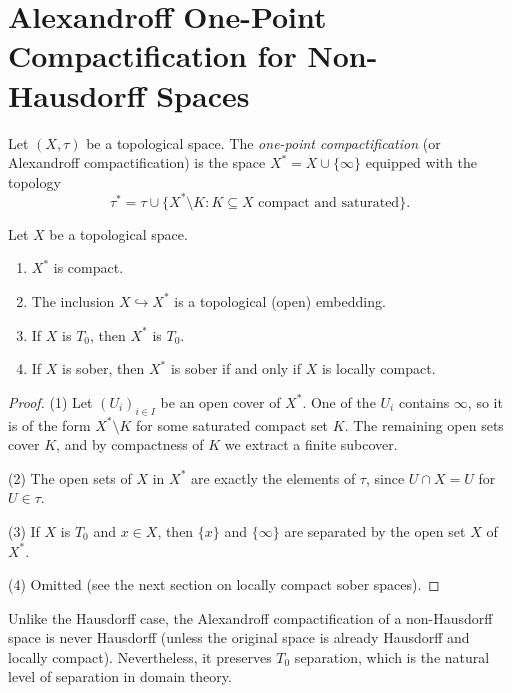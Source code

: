\section{Alexandroff One-Point Compactification for Non-Hausdorff Spaces}

\begin{definition}
Let $(X,\tau)$ be a topological space. The \emph{one-point compactification} (or
Alexandroff compactification) is the space $X^* = X \cup \{\infty\}$ equipped with
the topology
\[
  \tau^* = \tau \cup \{ X^* \setminus K : K \subseteq X \text{ compact and saturated} \}.
\]
\end{definition}

\begin{theorem}
Let $X$ be a topological space.
\begin{enumerate}
  \item $X^*$ is compact.
  \item The inclusion $X \hookrightarrow X^*$ is a topological (open) embedding.
  \item If $X$ is $T_0$, then $X^*$ is $T_0$.
  \item If $X$ is sober, then $X^*$ is sober if and only if $X$ is locally compact.
\end{enumerate}
\end{theorem}

\begin{proof}
(1) Let $(U_i)_{i \in I}$ be an open cover of $X^*$. One of the $U_i$ contains $\infty$,
so it is of the form $X^* \setminus K$ for some saturated compact set $K$. The remaining
open sets cover $K$, and by compactness of $K$ we extract a finite subcover.

(2) The open sets of $X$ in $X^*$ are exactly the elements of $\tau$, since
$U \cap X = U$ for $U \in \tau$.

(3) If $X$ is $T_0$ and $x \in X$, then $\{x\}$ and $\{\infty\}$ are separated by the
open set $X$ of $X^*$.

(4) Omitted (see the next section on locally compact sober spaces).
\end{proof}

\begin{remark}
Unlike the Hausdorff case, the Alexandroff compactification of a non-Hausdorff space is
never Hausdorff (unless the original space is already Hausdorff and locally compact).
Nevertheless, it preserves $T_0$ separation, which is the natural level of separation
in domain theory.
\end{remark}

